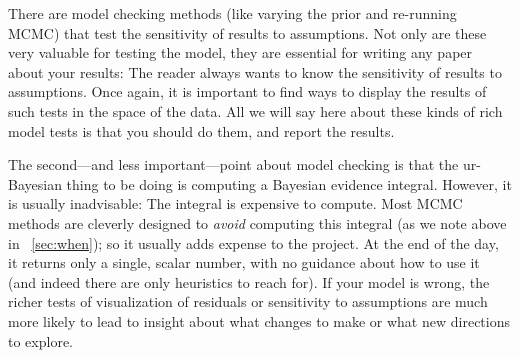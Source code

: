 \documentclass[12pt,twoside,pdftex]{article}
\begin{document}
There are model checking methods (like varying the prior and
re-running MCMC) that test the sensitivity of results to assumptions.
Not only are these very valuable for testing the model, they are
essential for writing any paper about your results: The reader always
wants to know the sensitivity of results to assumptions.
Once again, it is important to find ways to display the results of
such tests in the space of the data.
All we will say here about these kinds of rich model tests is that you
should do them, and report the results.

The second---and less important---point about model checking is that
the ur-Bayesian thing to be doing is computing a Bayesian evidence
integral.
However, it is usually inadvisable:
The integral is expensive to compute.
Most MCMC methods are cleverly designed to \emph{avoid} computing this
integral (as we note above in \sectionname~\ref{sec:when}); so it usually adds
expense to the project.
At the end of the day, it returns only a single, scalar number, with
no guidance about how to use it (and indeed there are only heuristics
to reach for).
If your model is wrong, the richer tests of visualization of residuals
or sensitivity to assumptions are much more likely to lead to insight
about what changes to make or what new directions to explore.






\end{document}
